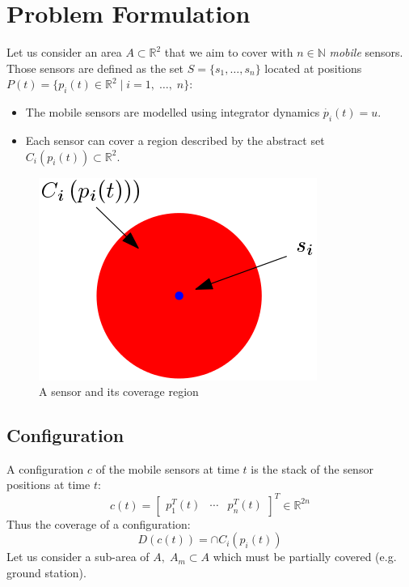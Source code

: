 \documentclass{iacas}
\newcommand{\rsqr}{\mathbb{R}^2}
\newcommand{\bmat}[1]{\begin{bmatrix}#1\end{bmatrix}}
\begin{document}
\section{Problem Formulation}
Let us consider an area $A \subset \rsqr$ that we aim to cover with $n \in \mathbb{N}$ \emph{mobile} sensors. Those sensors are defined as the set $S = \{s_1, \ldots, s_n\}$ located at positions $P(t) = \{ p_i (t) \in \rsqr \mid i = 1,\; \ldots ,\; n\}$:
\begin{itemize}
\item The mobile sensors are modelled using integrator dynamics $\dot{p_i}(t)=u$.
\item Each sensor can cover a region described by the abstract set $C_i \left( p_i(t) \right) \subset \rsqr$.
\end{itemize}

\begin{figure}[H]
\centering
\includegraphics[scale=0.6]{figures/problem-def/sensor-and-coverage.png}
\caption{A sensor and its coverage region}
\end{figure}

\subsection{Configuration}
A configuration $c$ of the mobile sensors at time $t$ is the stack of the sensor positions at time $t$:
\begin{equation*}
c\left(t\right) = \bmat{
p_{1}^{T}\left(t\right)&\cdots&p_{n}^{T}\left(t\right)}^{T}\in\mathbb{R}^{2n}
\end{equation*}
Thus the coverage of a configuration:
\begin{equation*}
D\left( c\left( t \right) \right) = \cap C_i(p_i(t))
\end{equation*}
Let us consider a sub-area of $A,\; A_m \subset A$ which must be partially covered (e.g. ground station).
\end{document}

